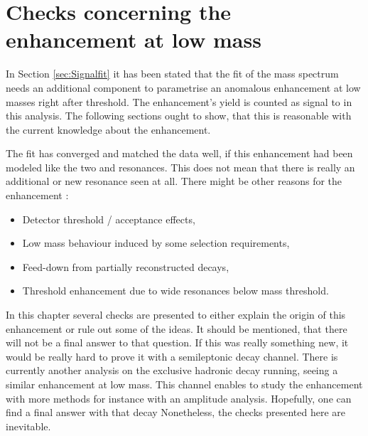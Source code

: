 \chapter{Checks concerning the enhancement at low \Dz\proton mass}

In Section \ref{sec:Signalfit} it has been stated that the fit of the \Dz\proton mass spectrum needs an additional component to parametrise an anomalous enhancement at low \Dz\proton masses right after threshold.
The enhancement's yield is counted as signal to \NDp in this analysis.
The following sections ought to show, that this is reasonable with the current knowledge about the enhancement.

The fit has converged and matched the data well, if this enhancement had been modeled like the two \LcResI and \LcResII resonances.
This does not mean that there is really an additional or new resonance seen at all.
There might be other reasons for the enhancement :
\begin{itemize}
    \item Detector threshold / acceptance effects,
    \item Low mass behaviour induced by some selection requirements,
    \item Feed-down from partially reconstructed decays,
    \item Threshold enhancement due to wide resonances below \Dz\proton mass threshold.
\end{itemize}
In this chapter several checks are presented to either explain the origin of this enhancement or rule out some of the ideas.
It should be mentioned, that there will not be a final answer to that question.
If this was really something new, it would be really hard to prove it with a semileptonic decay channel.
There is currently another \lhcb analysis on the exclusive hadronic decay \decay{\Lb}{\Dz\proton\pim} running, seeing a similar enhancement at low \Dz\proton mass.
This channel enables to study the enhancement with more methods for instance with an amplitude analysis. 
Hopefully, one can find a final answer with that decay
Nonetheless, the checks presented here are inevitable.

